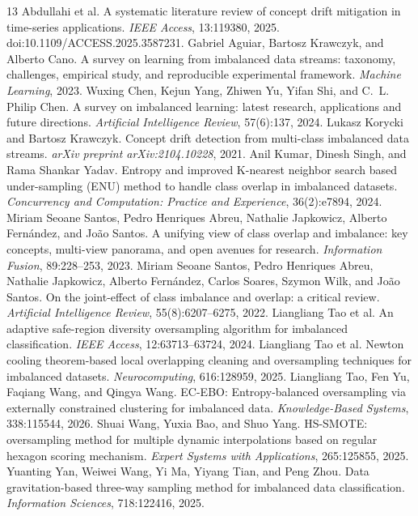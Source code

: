 \documentclass[preprint,10pt]{elsarticle}
\begin{document}
\begin{thebibliography}{13}
 Abdullahi et al. A systematic literature review of concept drift mitigation in time-series applications. \emph{IEEE Access}, 13:119380, 2025. doi:10.1109/ACCESS.2025.3587231.
 Gabriel Aguiar, Bartosz Krawczyk, and Alberto Cano. A survey on learning from imbalanced data streams: taxonomy, challenges, empirical study, and reproducible experimental framework. \emph{Machine Learning}, 2023.
 Wuxing Chen, Kejun Yang, Zhiwen Yu, Yifan Shi, and C.~L. Philip Chen. A survey on imbalanced learning: latest research, applications and future directions. \emph{Artificial Intelligence Review}, 57(6):137, 2024.
 Lukasz Korycki and Bartosz Krawczyk. Concept drift detection from multi-class imbalanced data streams. \emph{arXiv preprint arXiv:2104.10228}, 2021.
 Anil Kumar, Dinesh Singh, and Rama Shankar Yadav. Entropy and improved K-nearest neighbor search based under-sampling (ENU) method to handle class overlap in imbalanced datasets. \emph{Concurrency and Computation: Practice and Experience}, 36(2):e7894, 2024.
 Miriam Seoane Santos, Pedro Henriques Abreu, Nathalie Japkowicz, Alberto Fern\'andez, and Jo\~ao Santos. A unifying view of class overlap and imbalance: key concepts, multi-view panorama, and open avenues for research. \emph{Information Fusion}, 89:228--253, 2023.
 Miriam Seoane Santos, Pedro Henriques Abreu, Nathalie Japkowicz, Alberto Fern\'andez, Carlos Soares, Szymon Wilk, and Jo\~ao Santos. On the joint-effect of class imbalance and overlap: a critical review. \emph{Artificial Intelligence Review}, 55(8):6207--6275, 2022.
 Liangliang Tao et al. An adaptive safe-region diversity oversampling algorithm for imbalanced classification. \emph{IEEE Access}, 12:63713--63724, 2024.
 Liangliang Tao et al. Newton cooling theorem-based local overlapping cleaning and oversampling techniques for imbalanced datasets. \emph{Neurocomputing}, 616:128959, 2025.
 Liangliang Tao, Fen Yu, Faqiang Wang, and Qingya Wang. EC-EBO: Entropy-balanced oversampling via externally constrained clustering for imbalanced data. \emph{Knowledge-Based Systems}, 338:115544, 2026.
 Shuai Wang, Yuxia Bao, and Shuo Yang. HS-SMOTE: oversampling method for multiple dynamic interpolations based on regular hexagon scoring mechanism. \emph{Expert Systems with Applications}, 265:125855, 2025.
 Yuanting Yan, Weiwei Wang, Yi Ma, Yiyang Tian, and Peng Zhou. Data gravitation-based three-way sampling method for imbalanced data classification. \emph{Information Sciences}, 718:122416, 2025.

\end{thebibliography}
\end{document}
